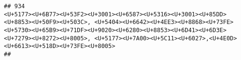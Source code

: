 \documentclass[
]{article}
\begin{document}
\begin{verbatim}
## 934                                                                                                                                                                                                                                                              <U+5177><U+6B77><U+53F2><U+3001><U+6587><U+5316><U+3001><U+85DD><U+8853><U+50F9><U+503C>, <U+5404><U+6642><U+4EE3><U+8868><U+73FE><U+5730><U+65B9><U+71DF><U+9020><U+6280><U+8853><U+6D41><U+6D3E><U+7279><U+8272><U+8005>, <U+5177><U+7A00><U+5C11><U+6027>,<U+4E0D><U+6613><U+518D><U+73FE><U+8005>
##                                                                                                                                                                                                                                                                                                                                                                                                                                                                                                                                                                                                                                                                                                                                                                                                                                                                                                                                                                                                                                                                                                                                                                                                                                                                                                                                                                                                                                                                                                                                                                                                                                                                                                                                                                                                                                                                                                                                                                                                                                                                                                                                                                                                                                                                                                                                                                                                                                                                                                                                                                                                                                                                                                                                                                                                                                                                           
\end{verbatim}
\end{document}
